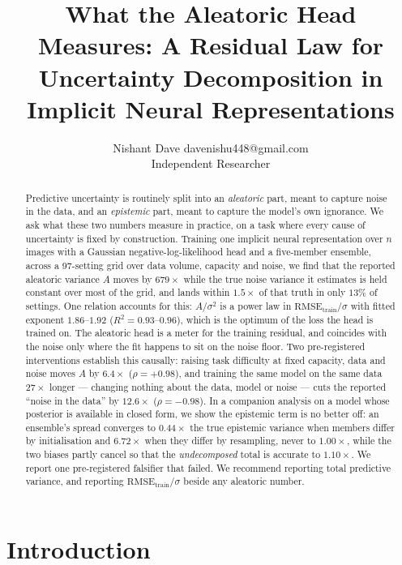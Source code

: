 \documentclass[10pt]{article}
\title{What the Aleatoric Head Measures: A Residual Law for\\
Uncertainty Decomposition in Implicit Neural Representations}
\author{\name Nishant Dave \email davenishu448@gmail.com \\
      \addr Independent Researcher}
\begin{document}
\maketitle

\begin{abstract}
\noindent
Predictive uncertainty is routinely split into an \emph{aleatoric} part, meant to capture
noise in the data, and an \emph{epistemic} part, meant to capture the model's own ignorance.
We ask what these two numbers measure in practice, on a task where every cause of
uncertainty is fixed by construction. Training one implicit neural representation over
$n$ images with a Gaussian negative-log-likelihood head and a five-member ensemble, across a
97-setting grid over data volume, capacity and noise, we find that the reported aleatoric
variance $A$ moves by $679\times$ while the true noise variance it estimates is held
constant over most of the grid, and lands within $1.5\times$ of that truth in only $13\%$ of
settings. One relation accounts for this: $A/\sigma^2$ is a power law in
$\mathrm{RMSE}_{\mathrm{train}}/\sigma$ with fitted exponent $1.86$--$1.92$
($R^2 = 0.93$--$0.96$), which is the optimum of the loss the head is trained on. The
aleatoric head is a meter for the training residual, and coincides with the noise only where
the fit happens to sit on the noise floor. Two pre-registered interventions establish this
causally: raising task difficulty at fixed capacity, data and noise moves $A$ by $6.4\times$
($\rho=+0.98$), and training the same model on the same data $27\times$ longer --- changing
nothing about the data, model or noise --- cuts the reported ``noise in the data'' by
$12.6\times$ ($\rho=-0.98$). In a companion analysis on a model whose posterior is available
in closed form, we show the epistemic term is no better off: an ensemble's spread converges
to $0.44\times$ the true epistemic variance when members differ by initialisation and
$6.72\times$ when they differ by resampling, never to $1.00\times$, while the two biases
partly cancel so that the \emph{undecomposed} total is accurate to $1.10\times$. We report
one pre-registered falsifier that failed. We recommend reporting total predictive variance,
and reporting $\mathrm{RMSE}_{\mathrm{train}}/\sigma$ beside any aleatoric number.
\end{abstract}

\section{Introduction}
\end{document}
